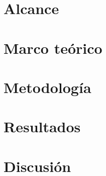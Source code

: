 \documentclass[11pt, letterpaper, twoside, openright]{report}
\newcommand{\defaultparformat}[1]{
	{\setlength{\parskip}{2ex}
     }
}
\begin{document}
\ifdefined\CAPalcance
	\newpage
	\chapter{Alcance}
	\ifdefined\parpordefecto
    	\defaultparformat{h-alcance}
    \else
    	
    \fi 
\fi

\ifdefined\CAPmarcoteorico
	\newpage
	\chapter{Marco teórico}
	\ifdefined\parpordefecto
		\defaultparformat{i-marco_teorico}
	\else
		
	\fi
\fi

\ifdefined\CAPmetodologia
	\newpage
	\chapter{Metodología}
	\ifdefined\parpordefecto
		\defaultparformat{j-metodologia}
	\else
		
	\fi
\fi

%	

\ifdefined\CAPresultados
	\newpage
	\chapter{Resultados}
	\ifdefined\parpordefecto
		\defaultparformat{k-resultados}
	\else
		
	\fi
\fi

\ifdefined\CAPdiscusion
	\newpage
	\chapter{Discusión}
	\ifdefined\parpordefecto
		\defaultparformat{l-discusion}
	\else
		
	\fi
\fi

\ifdefined\CAPconclusiones
	\newpage
\end{document}
